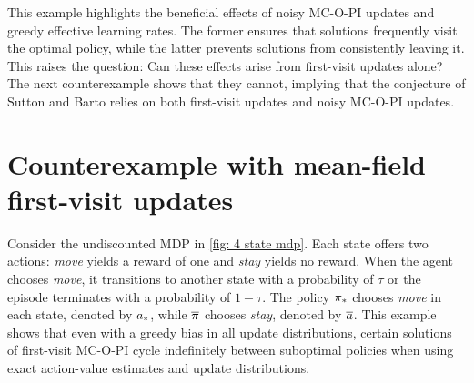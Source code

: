 This example highlights the beneficial effects of noisy MC-O-PI updates and greedy effective learning rates. The former ensures that solutions frequently visit the optimal policy, while the latter prevents solutions from consistently leaving it.
This raises the question: Can these effects arise from first-visit updates alone?
The next counterexample shows that they cannot,
implying that the conjecture of Sutton and Barto relies on both first-visit updates and noisy MC-O-PI updates.








\vspace{-0.1cm}

\section{Counterexample with mean-field first-visit updates}
\label{sec: counter greedy 4s}

\vspace{-0.1cm}

Consider the undiscounted MDP in \autoref{fig: 4 state mdp}. Each state offers two actions: \textit{move} yields a reward of one and \textit{stay} yields no reward. When the agent chooses \textit{move}, it transitions to another state with a probability of $\tau$ or the episode terminates with a probability of $1-\tau$. 
The policy ${\pi}_*$ chooses \textit{move} in each state, denoted by ${a}_*$, while $\overline{\pi}$ chooses \textit{stay}, denoted by $\overline{a}$.
This example shows that even with a greedy bias in all update distributions,
certain solutions of first-visit MC-O-PI cycle indefinitely between suboptimal policies when using exact action-value estimates and update distributions.



